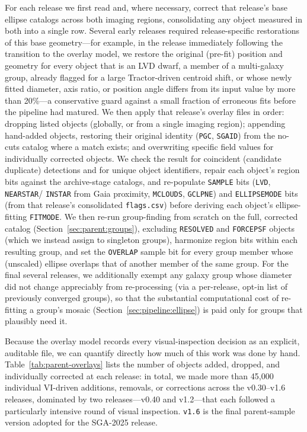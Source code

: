 \documentclass[modern,linenumbers]{aastex701}
\begin{document}
For each release we first read and, where necessary, correct that
release's base ellipse catalogs across both imaging regions,
consolidating any object measured in both into a single row. Several
early releases required release-specific restorations of this base
geometry---for example, in the release immediately following the
transition to the overlay model, we restore the original (pre-fit)
position and geometry for every object that is an LVD dwarf, a member
of a multi-galaxy group, already flagged for a large Tractor-driven
centroid shift, or whose newly fitted diameter, axis ratio, or position
angle differs from its input value by more than 20\%---a conservative
guard against a small fraction of erroneous fits before the pipeline
had matured. We then apply that release's overlay files in order:
dropping listed objects (globally, or from a single imaging region);
appending hand-added objects, restoring their original identity
(\texttt{PGC}, \texttt{SGAID}) from the no-cuts catalog where a match
exists; and overwriting specific field values for individually
corrected objects. We check the result for coincident (candidate
duplicate) detections and for unique object identifiers, repair each
object's region bits against the archive-stage catalogs, and
re-populate \texttt{SAMPLE} bits (\texttt{LVD}, \texttt{NEARSTAR}/
\texttt{INSTAR} from Gaia proximity, \texttt{MCLOUDS}, \texttt{GCLPNE})
and \texttt{ELLIPSEMODE} bits (from that release's consolidated
\texttt{flags.csv}) before deriving each object's ellipse-fitting
\texttt{FITMODE}. We then re-run group-finding from scratch on the
full, corrected catalog (Section~\ref{sec:parent:groups}), excluding
\texttt{RESOLVED} and \texttt{FORCEPSF} objects (which we instead
assign to singleton groups), harmonize region bits within each
resulting group, and set the \texttt{OVERLAP} sample bit for every
group member whose (unscaled) ellipse overlaps that of another member
of the same group. For the final several releases, we additionally
exempt any
galaxy group whose diameter did not change appreciably from
re-processing (via a per-release, opt-in list of previously converged
groups), so that the substantial computational cost of re-fitting a
group's mosaic (Section~\ref{sec:pipeline:ellipse}) is paid only for
groups that plausibly need it.

Because the overlay model records every visual-inspection decision as
an explicit, auditable file, we can quantify directly how much of this
work was done by hand. Table~\ref{tab:parent-overlays} lists the
number of objects added, dropped, and individually corrected at each
release: in total, we made more than 45,000 individual VI-driven
additions, removals, or corrections across the v0.30--v1.6 releases,
dominated by two releases---v0.40 and v1.2---that each followed a
particularly intensive round of visual inspection. \texttt{v1.6} is
the final parent-sample version adopted for the SGA-2025 release.






\end{document}
